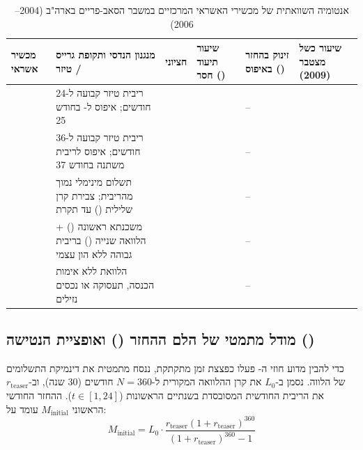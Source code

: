 \begin{table}[htbp]
\caption{אנטומיה השוואתית של מכשירי האשראי המרכזיים במשבר הסאב-פריים בארה"ב (\num{2004}--\num{2006}) \cite{mayer2009rise,foote2008subprime,keys2010did}}
\label{tab:subprime_products}
\centering
\small
\renewcommand{\arraystretch}{1.28}
\begin{tabularx}{\textwidth}{R{2.6cm} Y R{1.8cm} R{2.1cm} R{2.1cm} R{2.0cm}}
\toprule
{}
\textbf{מכשיר אשראי} & \textbf{מנגנון הנדסי ותקופת גרייס / טיזר} & \textbf{ חציוני} & \textbf{שיעור תיעוד חסר ()} & \textbf{זינוק בהחזר באיפוס ()} & \textbf{שיעור כשל מצטבר (\num{2009})} \\
\midrule
\textbf{} & ריבית טיזר קבועה ל-\num{24} חודשים; איפוס ל- בחודש \num{25} &  &  & -- &  \\
\textbf{} & ריבית טיזר קבועה ל-\num{36} חודשים; איפוס לריבית משתנה בחודש \num{37} &  &  & -- &  \\
\textbf{} & תשלום מינימלי נמוך מהריבית; צבירת קרן שלילית () עד תקרת  &  &  & -- &  \\
\textbf{} & משכנתא ראשונה () + הלוואה שנייה () בריבית גבוהה ללא הון עצמי &  &  & -- &  \\
\textbf{} & הלוואת  ללא אימות הכנסה, תעסוקה או נכסים נזילים &  &  & -- &  \\
\bottomrule
\end{tabularx}
\end{table}

\subsection{מודל מתמטי של הלם ההחזר () ואופציית הנטישה ()}
כדי להבין מדוע חוזי ה- פעלו כפצצת זמן מתקתקת, ננסח מתמטית את דינמיקת התשלומים של הלווה. נסמן ב-$L_0$ את קרן ההלוואה המקורית ל-$N=360$ חודשים (\num{30} שנה), וב-$r_{\text{teaser}}$ את הריבית החודשית המסובסדת בשנתיים הראשונות ($t \in [1, 24]$). ההחזר החודשי הראשוני $M_{\text{initial}}$ עומד על:
\begin{equation}
\label{eq:arm_initial}
M_{\text{initial}} = L_0 \cdot \frac{r_{\text{teaser}}\left(1 + r_{\text{teaser}}\right)^{360}}{\left(1 + r_{\text{teaser}}\right)^{360} - 1}
\end{equation}

